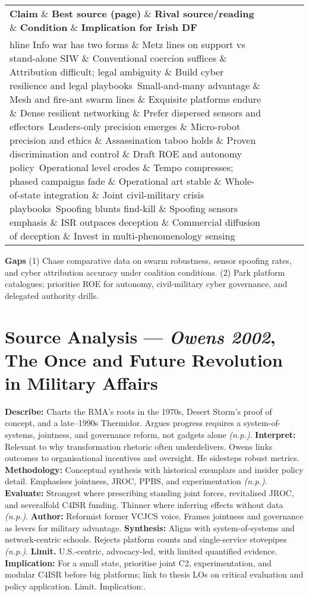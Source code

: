  
\begin{tabular}{p{3.2cm}p{4.2cm}p{3.6cm}p{3.2cm}p{4.2cm}}
	\textbf{Claim} \& \textbf{Best source (page)} \& \textbf{Rival source/reading} \& \textbf{Condition} \& \textbf{Implication for Irish DF}\\hline
	Info war has two forms \& Metz lines on support vs stand-alone SIW \& Conventional coercion suffices \& Attribution difficult; legal ambiguity \& Build cyber resilience and legal playbooks\
	Small-and-many advantage \& Mesh and fire-ant swarm lines \& Exquisite platforms endure \& Dense resilient networking \& Prefer dispersed sensors and effectors\
	Leaders-only precision emerges \& Micro-robot precision and ethics \& Assassination taboo holds \& Proven discrimination and control \& Draft ROE and autonomy policy\
	Operational level erodes \& Tempo compresses; phased campaigns fade \& Operational art stable \& Whole-of-state integration \& Joint civil-military crisis playbooks\
	Spoofing blunts find-kill \& Spoofing sensors emphasis \& ISR outpaces deception \& Commercial diffusion of deception \& Invest in multi-phenomenology sensing\
\end{tabular}

\textbf{Gaps}
(1) Chase comparative data on swarm robustness, sensor spoofing rates, and cyber attribution accuracy under coalition conditions.
(2) Park platform catalogues; prioritise ROE for autonomy, civil-military cyber governance, and delegated authority drills.

\parencite{OWENS_2002}

\section*{Source Analysis — \textit{Owens 2002}, The Once and Future Revolution in Military Affairs}
\textbf{Describe:} Charts the RMA’s roots in the 1970s, Desert Storm’s proof of concept, and a late–1990s Thermidor. Argues progress requires a system-of-systems, jointness, and governance reform, not gadgets alone \emph{(n.p.)}.
\textbf{Interpret:} Relevant to why transformation rhetoric often underdelivers. Owens links outcomes to organisational incentives and oversight. He sidesteps robust metrics.
\textbf{Methodology:} Conceptual synthesis with historical exemplars and insider policy detail. Emphasises jointness, JROC, PPBS, and experimentation \emph{(n.p.)}.
\textbf{Evaluate:} Strongest where prescribing standing joint forces, revitalised JROC, and severalfold C4ISR funding. Thinner where inferring effects without data \emph{(n.p.)}.
\textbf{Author:} Reformist former VCJCS voice. Frames jointness and governance as levers for military advantage.
\textbf{Synthesis:} Aligns with system-of-systems and network-centric schools. Rejects platform counts and single-service stovepipes \emph{(n.p.)}.
\textbf{Limit.} U.S.-centric, advocacy-led, with limited quantified evidence. \textbf{Implication:} For a small state, prioritise joint C2, experimentation, and modular C4ISR before big platforms; link to thesis LOs on critical evaluation and policy application. Limit. Implication:.

